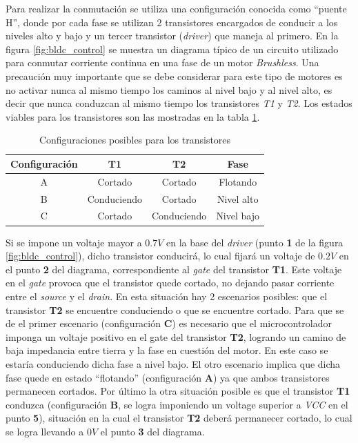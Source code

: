 \documentclass[main]{subfiles}
\begin{document}
Para realizar la conmutación se utiliza una configuración conocida como ``puente H'', donde por cada fase se utilizan 2 transistores encargados de conducir a los niveles alto y bajo y un tercer transistor (\emph{driver}) que maneja al primero. En la figura \ref{fig:bldc_control} se muestra un diagrama típico de un circuito utilizado para conmutar corriente continua en una fase de un motor \emph{Brushless}. Una precaución muy importante que se debe considerar para este tipo de motores es no activar nunca al mismo tiempo los caminos al nivel bajo y al nivel alto, es decir que nunca conduzcan al mismo tiempo los transistores \emph{T1} y \emph{T2}. Los estados viables para los transistores son las mostradas en la tabla \ref{tab:estado_transistores}.\\

\begin{table}[H]
\begin{center}
\vspace{-10pt}
\begin{tabular}{|c|c|c|c|}
\hline
\textbf{Configuración} & \textbf{T1} & \textbf{T2} & \textbf{Fase} \\ \hline
A & Cortado & Cortado & Flotando \\
B & Conduciendo & Cortado & Nivel alto \\
C & Cortado & Conduciendo & Nivel bajo \\
\hline
\end{tabular}
\caption{Configuraciones posibles para los transistores}
\vspace{-20pt}
\label{tab:estado_transistores}
\end{center}
\end{table}

Si se impone un voltaje mayor a $0.7 V$ en la base del \emph{driver} (punto \textbf{1} de la figura \ref{fig:bldc_control}), dicho transistor conducirá, lo cual fijará un voltaje de $0.2V$ en el punto \textbf{2} del diagrama, correspondiente al \emph{gate} del transistor \textbf{T1}. Este voltaje en el \emph{gate} provoca que el transistor quede cortado, no dejando pasar corriente entre el \emph{source} y el \emph{drain}. En esta situación hay 2 escenarios posibles: que el transistor \textbf{T2} se encuentre conduciendo o que se encuentre cortado. Para que se de el primer escenario (configuración \textbf{C}) es necesario que el microcontrolador imponga un voltaje positivo en el gate del transistor \textbf{T2}, logrando un camino de baja impedancia entre tierra y la fase en cuestión del motor. En este caso se estaría conduciendo dicha fase a nivel bajo. El otro escenario implica que dicha fase quede en estado ``flotando'' (configuración \textbf{A}) ya que ambos transistores permanecen cortados. Por último la otra situación posible es que el transistor \textbf{T1} conduzca (configuración \textbf{B}, se logra imponiendo un voltage superior a \textit{VCC} en el punto \textbf{5}), situación en la cual el transistor \textbf{T2} deberá permanecer cortado, lo cual se logra llevando a $0V$ el punto \textbf{3} del diagrama.\\
\end{document}
